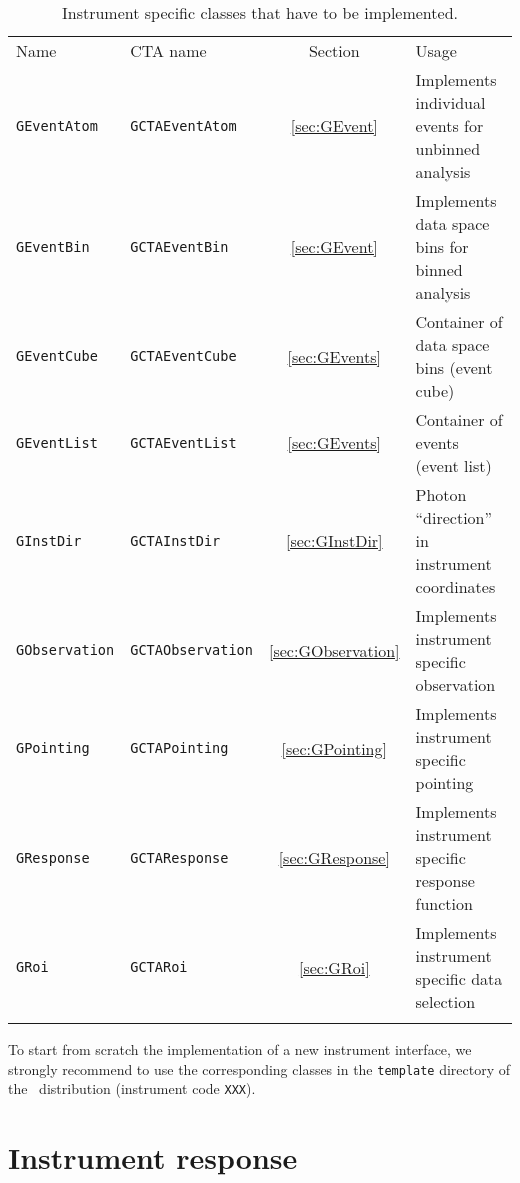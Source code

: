 \documentclass{article}[12pt,a4]
\begin{document}
\begin{table}[!h]
\caption{Instrument specific classes that have to be implemented.
\label{tab:classes}}
\begin{center}
\begin{tabular}{llcl}
\hline
\hline
\noalign{\smallskip}
Name & CTA name & Section & Usage \\
\noalign{\smallskip}
\hline
\noalign{\smallskip}
{\tt GEventAtom} & {\tt GCTAEventAtom} & \ref{sec:GEvent} 
  & Implements individual events for unbinned analysis \\
{\tt GEventBin} & {\tt GCTAEventBin} &  \ref{sec:GEvent}
  & Implements data space bins for binned analysis \\
{\tt GEventCube} & {\tt GCTAEventCube} & \ref{sec:GEvents}
  & Container of data space bins (event cube) \\
{\tt GEventList} & {\tt GCTAEventList} & \ref{sec:GEvents}
  & Container of events (event list) \\
{\tt GInstDir} & {\tt GCTAInstDir} & \ref{sec:GInstDir}
  & Photon ``direction'' in instrument coordinates \\
{\tt GObservation} & {\tt GCTAObservation} & \ref{sec:GObservation}
  & Implements instrument specific observation \\
{\tt GPointing} & {\tt GCTAPointing} & \ref{sec:GPointing}
  & Implements instrument specific pointing \\
{\tt GResponse} & {\tt GCTAResponse} & \ref{sec:GResponse} 
  & Implements instrument specific response function \\
{\tt GRoi} & {\tt GCTARoi} & \ref{sec:GRoi}
  & Implements instrument specific data selection \\
\noalign{\smallskip}
\hline
\end{tabular}
\end{center}
\end{table}

To start from scratch the implementation of a new instrument interface, we strongly
recommend to use the corresponding classes in the {\tt template} directory of the \this\ 
distribution (instrument code {\tt XXX}).


\section{Instrument response}
\end{document}
